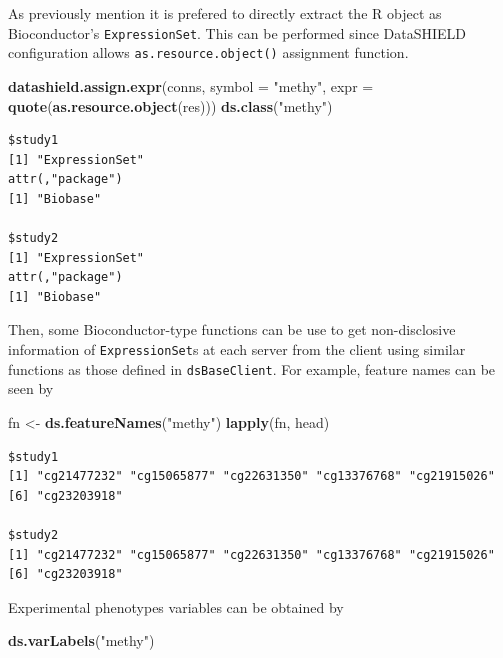 \documentclass[]{article}
\newenvironment{Shaded}{\begin{snugshade}}{\end{snugshade}}
\newcommand{\DataTypeTok}[1]{\textcolor[rgb]{0.13,0.29,0.53}{#1}}
\newcommand{\KeywordTok}[1]{\textcolor[rgb]{0.13,0.29,0.53}{\textbf{#1}}}
\newcommand{\NormalTok}[1]{#1}
\newcommand{\StringTok}[1]{\textcolor[rgb]{0.31,0.60,0.02}{#1}}
\begin{document}
As previously mention it is prefered to directly extract the R object as
Bioconductor's \texttt{ExpressionSet}. This can be performed since
DataSHIELD configuration allows \texttt{as.resource.object()} assignment
function.

\begin{Shaded}
\begin{Highlighting}[]
\KeywordTok{datashield.assign.expr}\NormalTok{(conns, }\DataTypeTok{symbol =} \StringTok{"methy"}\NormalTok{, }
                       \DataTypeTok{expr =} \KeywordTok{quote}\NormalTok{(}\KeywordTok{as.resource.object}\NormalTok{(res)))}
\KeywordTok{ds.class}\NormalTok{(}\StringTok{"methy"}\NormalTok{)}
\end{Highlighting}
\end{Shaded}

\begin{verbatim}
$study1
[1] "ExpressionSet"
attr(,"package")
[1] "Biobase"

$study2
[1] "ExpressionSet"
attr(,"package")
[1] "Biobase"
\end{verbatim}

Then, some Bioconductor-type functions can be use to get non-disclosive
information of \texttt{ExpressionSet}s at each server from the client
using similar functions as those defined in \texttt{dsBaseClient}. For
example, feature names can be seen by

\begin{Shaded}
\begin{Highlighting}[]
\NormalTok{fn <{-}}\StringTok{ }\KeywordTok{ds.featureNames}\NormalTok{(}\StringTok{"methy"}\NormalTok{)}
\KeywordTok{lapply}\NormalTok{(fn, head)}
\end{Highlighting}
\end{Shaded}

\begin{verbatim}
$study1
[1] "cg21477232" "cg15065877" "cg22631350" "cg13376768" "cg21915026"
[6] "cg23203918"

$study2
[1] "cg21477232" "cg15065877" "cg22631350" "cg13376768" "cg21915026"
[6] "cg23203918"
\end{verbatim}

Experimental phenotypes variables can be obtained by

\begin{Shaded}
\begin{Highlighting}[]
\KeywordTok{ds.varLabels}\NormalTok{(}\StringTok{"methy"}\NormalTok{)}
\end{Highlighting}
\end{Shaded}
\end{document}
